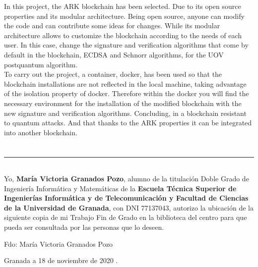 In this project, the ARK blockchain has been selected. Due to its open source properties and its modular architecture. Being open source, anyone can modify the code and can contribute some ideas for changes. While its modular architecture allows to customize the blockchain according to the needs of each user. In this case, change the signature and verification algorithms that come by default in the blockchain, ECDSA and Schnorr algorithms, for the UOV postquantum algorithm.\\

To carry out the project, a container, docker, has been used so that the blockchain installations are not reflected in the local machine, taking advantage of the isolation property of docker. Therefore within the docker you will find the necessary environment for the installation of the modified blockchain with the new signature and verification algorithms. Concluding, in a blockchain resistant to quantum attacks. And that thanks to the ARK properties it can be integrated into another blockchain.\\




\chapter*{}
\thispagestyle{empty}

\noindent\rule[-1ex]{\textwidth}{2pt}\\[4.5ex]

Yo, \textbf{María Victoria Granados Pozo}, alumno de la titulación Doble Grado de Ingeniería Informática y Matemáticas de la \textbf{Escuela Técnica Superior
de Ingenierías Informática y de Telecomunicación y Facultad de Ciencias de la Universidad de Granada}, con DNI 77137043, autorizo la
ubicación de la siguiente copia de mi Trabajo Fin de Grado en la biblioteca del centro para que pueda ser
consultada por las personas que lo deseen.

\vspace{6cm}

\noindent Fdo: María Victoria Granados Pozo

\vspace{2cm}

\begin{flushright}
Granada a 18 de noviembre de 2020 .
\end{flushright}


\chapter*{}
\thispagestyle{empty}

